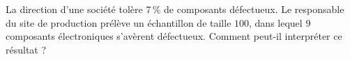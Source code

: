 
La direction d'une société tolère 7\,\% de composants défectueux. Le responsable du site de production prélève un échantillon de taille $100$, dans lequel $9$ composants électroniques s'avèrent défectueux. Comment peut-il interpréter ce résultat ? 
